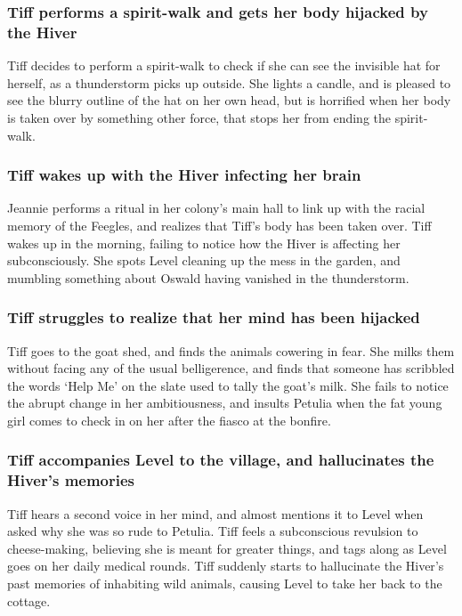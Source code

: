 \subsubsection{\Gls{Tiff} performs a spirit-walk and gets her body hijacked by the \Gls{Hiver}}
\Gls{Tiff} decides to perform a spirit-walk to check if she can see the invisible hat for herself,
as a thunderstorm picks up outside. She lights a candle, and is pleased to see the blurry outline
of the hat on her own head, but is horrified when her body is taken over by something other force,
that stops her from ending the spirit-walk.

\subsubsection{\Gls{Tiff} wakes up with the \Gls{Hiver} infecting her brain}
\Gls{Jeannie} performs a ritual in her colony's main hall to link up with the racial memory of the
Feegles, and realizes that \Gls{Tiff}'s body has been taken over. \Gls{Tiff} wakes up in the
morning, failing to notice how the \Gls{Hiver} is affecting her subconsciously. She spots
\Gls{Level} cleaning up the mess in the garden, and mumbling something about \Gls{Oswald} having
vanished in the thunderstorm.

\subsubsection{\Gls{Tiff} struggles to realize that her mind has been hijacked}
\Gls{Tiff} goes to the goat shed, and finds the animals cowering in fear. She milks them without
facing any of the usual belligerence, and finds that someone has scribbled the words `Help Me' on
the slate used to tally the goat's milk. She fails to notice the abrupt change in her ambitiousness,
and insults \Gls{Petulia} when the fat young girl comes to check in on her after the fiasco at the
bonfire.

\subsubsection{\Gls{Tiff} accompanies \Gls{Level} to the village, and hallucinates the \Gls{Hiver}'s
    memories}
\Gls{Tiff} hears a second voice in her mind, and almost mentions it to \Gls{Level} when asked why
she was so rude to \Gls{Petulia}. \Gls{Tiff} feels a subconscious revulsion to cheese-making,
believing she is meant for greater things, and tags along as \Gls{Level} goes on her daily medical
rounds. \Gls{Tiff} suddenly starts to hallucinate the \Gls{Hiver}'s past memories of inhabiting
wild animals, causing \Gls{Level} to take her back to the cottage.

